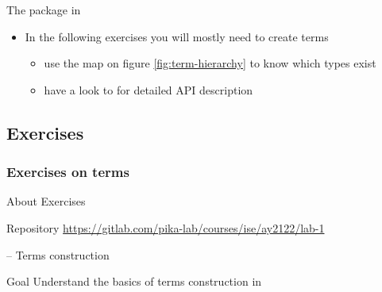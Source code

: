 \documentclass[presentation]{beamer}\mode<presentation>{\usetheme{AMSBolognaFC}}
\begin{document}
\begin{frame}[allowframebreaks]{The  package in }
\begin{itemize}
        \bigskip

        \item In the following exercises you will mostly need to create terms
        \begin{itemize}
            \item use the map on figure \ref{fig:term-hierarchy} to know \alert{which} types exist
            \item have a look to \cite{Ciatto20212pktPresentation} for detailed API description
        \end{itemize}
    \end{itemize}
\end{frame}

\subsection{Exercises}

\subsubsection{Exercises on terms}

\begin{frame}{About Exercises}

    \begin{block}{Repository}
        \centering
        \url{https://gitlab.com/pika-lab/courses/ise/ay2122/lab-1}
    \end{block}
    
\end{frame}

\startExercise{}

\begin{frame}{\currentExercise{} -- Terms construction}
    \label{slide:first-exercise-on-terms}

    \begin{block}{Goal}
        Understand the basics of terms construction in \twopkt{}
    \end{block}
    
\end{frame}

\startExercise{}
\end{document}
